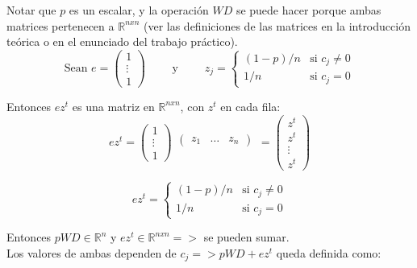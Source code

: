 		Notar que $p$ es un escalar, y la operación $WD$ se puede hacer porque ambas matrices pertenecen a $\mathbb{R}^{nxn}$ (ver las definiciones de las matrices en la introducción teórica o en el enunciado del trabajo práctico). \\

		\[ \text{Sean }
		        e       = \begin{pmatrix}
		                        1 \\
		                        \vdots \\
		                        1
		                \end  {pmatrix}
		\qquad
			\text{ y }
		\qquad
			z_{j} = \begin{cases}
		                        (1-p)/n & \text{si } c_{j} \neq 0 \\
		                         1   /n & \text{si } c_{j}   =  0
				\end  {cases}
		\]

		Entonces $e z^{t}$ es una matriz en $\mathbb{R}^{nxn}$, con $z^{t}$ en cada fila: \\

		\[
		        e z^{t} 	= 	\begin{pmatrix}
							1 \\
							\vdots \\
							1
						\end  {pmatrix}
						\begin{matrix}
							\begin{pmatrix}z_1 & \hdots & z_n
							\end  {pmatrix}\\\mbox{}
						\end{matrix}
					= 	\begin{pmatrix}
							z^t 	\\
							z^t 	\\
							\vdots 	\\
							z^t
						\end  {pmatrix}
		\]

		\[
			        ez^{t} = \begin{cases}
						(1-p)/n & \text{si } c_{j} \neq 0 \\
						 1   /n & \text{si } c_{j}   =  0
					 \end  {cases}
		\]

		Entonces $pWD \in \mathbb{R}^{n}$ y $ez^{t} \in \mathbb{R}^{nxn} =>$ se pueden sumar. \\

		Los valores de ambas dependen de $c_j => pWD+ez^t$ queda definida como:

